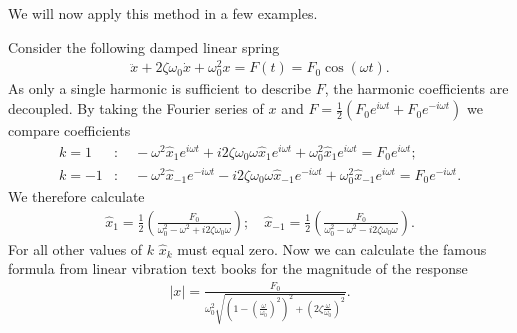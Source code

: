 We will now apply this method in a few examples.

\begin{ex}
	Consider the following damped linear spring
	\begin{align}
		\ddot{x} + 2 \zeta \omega _0 \dot{x} + \omega _0^2 x = F(t) = F_0 \cos (\omega t). 
	\end{align}
	As only a single harmonic is sufficient to describe $F$, the harmonic coefficients are decoupled. By taking the Fourier series of $x$ and $F=\frac{1}{2}\left( F_0 e^{i \omega t} + F_0 e^{-i \omega t}\right)$ we compare coefficients
	\begin{subequations}
	\begin{align}
		k=1&: \quad - \omega ^2 \hat{x}_1 e^{i \omega t} + i 2 \zeta \omega_0 \omega \hat{x}_1 e^{i \omega t} + \omega_0^2 \hat{x}_1 e^{i \omega t} = F_0 e^{i \omega t};\\
		k=-1&: \quad  - \omega^2 \hat{x}_{-1}e^{-i\omega t} - i 2 \zeta \omega_0 \omega \hat{x}_{-1} e^{-i \omega t} + \omega_0^2 \hat{x}_{-1}e^{i \omega t} = F_0 e^{-i \omega  t}.
	\end{align}
\end{subequations}
We therefore calculate 
\begin{align}
	\hat{x}_1 = \frac{1}{2} \left( \frac{F_0}{\omega_0^2 - \omega ^2 + i 2 \zeta \omega_0 \omega }\right);
\quad	
	\hat{x}_{-1} = \frac{1}{2} \left( \frac{F_0}{\omega_0^2 - \omega ^2 - i 2 \zeta \omega_0 \omega }\right).
\end{align}
For all other values of $k$ $\hat{x}_{k}$ must equal zero. Now we can calculate the famous formula from linear vibration text books for the magnitude of the response
\begin{align}
	|x | =  \frac{F_0}{\omega_0^2\sqrt{\left( 1 - \left( \frac{\omega }{\omega_0}\right)^{2}\right)^2 + \left(2 \zeta \frac{\omega }{\omega_0}\right)^2  }}.
\end{align}

\end{ex}

